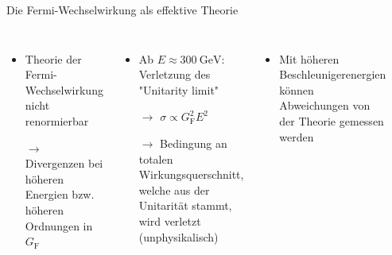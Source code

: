\documentclass[aspectratio=1610, professionalfonts, 10pt]{beamer}
\begin{document}
\begin{frame}{Die Fermi-Wechselwirkung als effektive Theorie}
	\begin{columns}
			\begin{itemize}
				\setlength\itemsep{0.5em}
				\item Theorie der Fermi-Wechselwirkung nicht renormierbar
				\item [$\rightarrow$] Divergenzen bei höheren Energien bzw. höheren Ordnungen in $G_\text{F}$
			\end{itemize}
				\vspace*{10px}
			\begin{itemize}
				\item Ab $E \approx \SI{300}{\giga\electronvolt}$: Verletzung des "Unitarity limit"
				\item [$\rightarrow$] $\sigma \propto G_\text{F}^2 E^2$
				\item [$\rightarrow$] Bedingung an totalen Wirkungsquerschnitt, welche aus der Unitarität stammt, wird verletzt (unphysikalisch) \cite{perkins_2000}
			\end{itemize}
			\vspace*{10px}
			\begin{itemize}
				\item Mit höheren Beschleunigerenergien können Abweichungen von der Theorie gemessen werden
			\end{itemize}
			\begin{figure}
	  			\centering
				\includegraphics[width=\linewidth]{Images/Enrico_Fermi_1943-49.jpg}

\end{figure}
\end{columns}
\end{frame}
\end{document}
